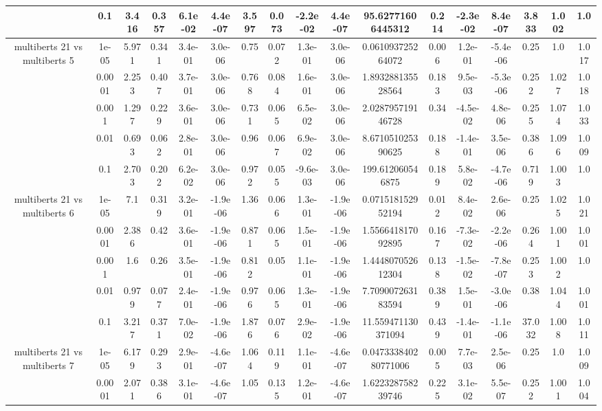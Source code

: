\begin{tabular}{|c|c|c|c|c|c|c|c|c|c|c|c|c|c|c|c|c|}
 & 0.1 & 3.416 & 0.357 & 6.1e-02 & 4.4e-07 & 3.597 & 0.073 & -2.2e-02 & 4.4e-07 & 95.62771606445312 & 0.214 & -2.3e-02 & 8.4e-07 & 3.833 & 1.002 & 1.0 \\
\hline
\multirow{5}{*}{multiberts 21 vs multiberts 5} & 1e-05 & 5.971 & 0.341 & 3.4e-01 & 3.0e-06 & 0.75 & 0.072 & 1.3e-01 & 3.0e-06 & 0.061093725264072 & 0.006 & 1.2e-01 & -5.4e-06 & 0.25 & 1.0 & 1.017 \\
 & 0.0001 & 2.253 & 0.407 & 3.7e-01 & 3.0e-06 & 0.768 & 0.084 & 1.6e-01 & 3.0e-06 & 1.893288135528564 & 0.183 & 9.5e-03 & -5.3e-06 & 0.252 & 1.027 & 1.018 \\
 & 0.001 & 1.297 & 0.229 & 3.6e-01 & 3.0e-06 & 0.731 & 0.065 & 6.5e-02 & 3.0e-06 & 2.028795719146728 & 0.34 & -4.5e-02 & 4.8e-06 & 0.255 & 1.074 & 1.033 \\
 & 0.01 & 0.693 & 0.062 & 2.8e-01 & 3.0e-06 & 0.96 & 0.067 & 6.9e-02 & 3.0e-06 & 8.671051025390625 & 0.188 & -1.4e-01 & 3.5e-06 & 0.386 & 1.096 & 1.009 \\
 & 0.1 & 2.703 & 0.202 & 6.2e-02 & 3.0e-06 & 0.972 & 0.055 & -9.6e-03 & 3.0e-06 & 199.612060546875 & 0.189 & 5.8e-02 & -4.7e-06 & 0.719 & 1.003 & 1.0 \\
\hline
\multirow{5}{*}{multiberts 21 vs multiberts 6} & 1e-05 & 7.1 & 0.319 & 3.2e-01 & -1.9e-06 & 1.36 & 0.066 & 1.3e-01 & -1.9e-06 & 0.071518152952194 & 0.012 & 8.4e-02 & 2.6e-06 & 0.25 & 1.025 & 1.021 \\
 & 0.0001 & 2.386 & 0.42 & 3.6e-01 & -1.9e-06 & 0.871 & 0.065 & 1.5e-01 & -1.9e-06 & 1.556641817092895 & 0.167 & -7.3e-02 & -2.2e-06 & 0.264 & 1.001 & 1.001 \\
 & 0.001 & 1.6 & 0.26 & 3.5e-01 & -1.9e-06 & 0.812 & 0.05 & 1.1e-01 & -1.9e-06 & 1.444807052612304 & 0.138 & -1.5e-02 & -7.8e-07 & 0.253 & 1.002 & 1.0 \\
 & 0.01 & 0.979 & 0.077 & 2.4e-01 & -1.9e-06 & 0.976 & 0.065 & 1.3e-01 & -1.9e-06 & 7.709007263183594 & 0.389 & 1.5e-01 & -3.0e-06 & 0.38 & 1.044 & 1.001 \\
 & 0.1 & 3.217 & 0.371 & 7.0e-02 & -1.9e-06 & 1.876 & 0.076 & 2.9e-02 & -1.9e-06 & 11.559471130371094 & 0.439 & -1.4e-01 & -1.1e-06 & 37.032 & 1.008 & 1.011 \\
\hline
\multirow{5}{*}{multiberts 21 vs multiberts 7} & 1e-05 & 6.179 & 0.293 & 2.9e-01 & -4.6e-07 & 1.064 & 0.119 & 1.1e-01 & -4.6e-07 & 0.047333840280771006 & 0.005 & 7.7e-03 & 2.5e-06 & 0.25 & 1.0 & 1.009 \\
 & 0.0001 & 2.071 & 0.386 & 3.1e-01 & -4.6e-07 & 1.05 & 0.135 & 1.2e-01 & -4.6e-07 & 1.622328758239746 & 0.225 & 3.1e-02 & 5.5e-07 & 0.252 & 1.001 & 1.004 \\

\end{tabular}
